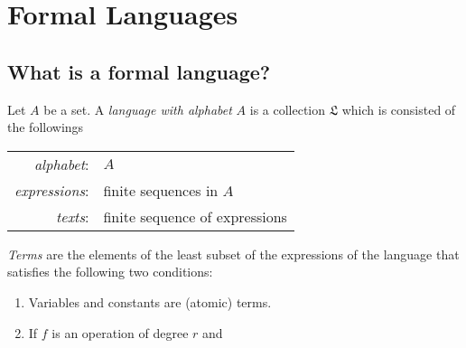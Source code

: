 \chapter{Formal Languages}

\section{What is a formal language?}
\begin{definition}
    Let \(A\) be a set. A \emph{language with alphabet} \(A\) is a collection \(\mathfrak{L}\) which is consisted of the followings
    \begin{center}
        \begin{tabular}{ r l }
            \emph{alphabet}: & \(A\) \\
            \emph{expressions}: & finite sequences in \(A\) \\
            \emph{texts}: & finite sequence of expressions
        \end{tabular}
    \end{center}
\end{definition}

\begin{definition}
    \emph{Terms} are the elements of the least subset of the expressions of the language that satisfies the following two conditions:
    \begin{enumerate}
        \item Variables and constants are (atomic) terms.
        \item If \(f\) is an operation of degree \(r\) and
    \end{enumerate}
\end{definition}